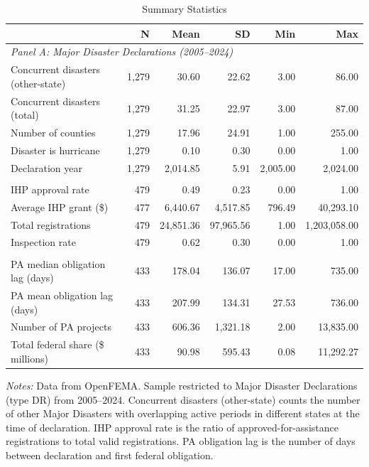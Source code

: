 \begin{table}[htbp]
\centering
\caption{Summary Statistics}
\label{tab:summary}
\small
\begin{tabular}{lrrrrr}
\toprule
& N & Mean & SD & Min & Max \\
\midrule
\multicolumn{6}{l}{\textit{Panel A: Major Disaster Declarations (2005--2024)}} \\
\quad Concurrent disasters (other-state) & 1,279 & 30.60 & 22.62 & 3.00 & 86.00 \\
\quad Concurrent disasters (total) & 1,279 & 31.25 & 22.97 & 3.00 & 87.00 \\
\quad Number of counties & 1,279 & 17.96 & 24.91 & 1.00 & 255.00 \\
\quad Disaster is hurricane & 1,279 & 0.10 & 0.30 & 0.00 & 1.00 \\
\quad Declaration year & 1,279 & 2,014.85 & 5.91 & 2,005.00 & 2,024.00 \\
\addlinespace
\multicolumn{6}{l}{\textit{Panel B: IHP Housing Assistance Outcomes}} \\
\quad IHP approval rate & 479 & 0.49 & 0.23 & 0.00 & 1.00 \\
\quad Average IHP grant (\$) & 477 & 6,440.67 & 4,517.85 & 796.49 & 40,293.10 \\
\quad Total registrations & 479 & 24,851.36 & 97,965.56 & 1.00 & 1,203,058.00 \\
\quad Inspection rate & 479 & 0.62 & 0.30 & 0.00 & 1.00 \\
\addlinespace
\multicolumn{6}{l}{\textit{Panel C: Public Assistance Outcomes}} \\
\quad PA median obligation lag (days) & 433 & 178.04 & 136.07 & 17.00 & 735.00 \\
\quad PA mean obligation lag (days) & 433 & 207.99 & 134.31 & 27.53 & 736.00 \\
\quad Number of PA projects & 433 & 606.36 & 1,321.18 & 2.00 & 13,835.00 \\
\quad Total federal share (\$ millions) & 433 & 90.98 & 595.43 & 0.08 & 11,292.27 \\
\bottomrule
\end{tabular}
\par\vspace{0.3em}
{\footnotesize \textit{Notes:} Data from OpenFEMA. Sample restricted to Major Disaster Declarations (type DR) from 2005--2024. Concurrent disasters (other-state) counts the number of other Major Disasters with overlapping active periods in different states at the time of declaration. IHP approval rate is the ratio of approved-for-assistance registrations to total valid registrations. PA obligation lag is the number of days between declaration and first federal obligation.}
\end{table}
